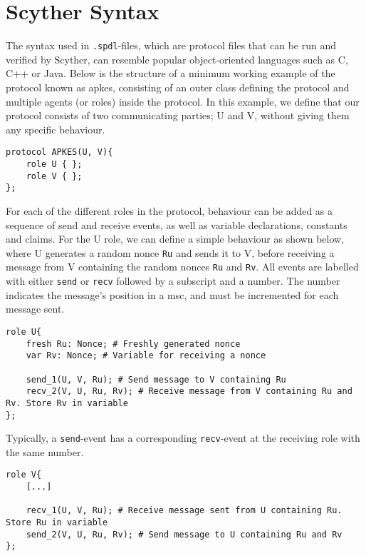\section{Scyther Syntax}


The syntax used in \verb!.spdl!-files, which are protocol files that can be run and verified by Scyther, can resemble popular object-oriented languages such as C, C++ or Java. Below is the structure of a minimum working example of the protocol known as \gls{apkes}, consisting of an outer class defining the protocol and multiple agents (or roles) inside the protocol. In this example, we define that our protocol consists of two communicating parties; U and V, without giving them any specific behaviour.\newline

\begin{lstlisting}
protocol APKES(U, V){
	role U { };
	role V { };  
};
\end{lstlisting}

For each of the different roles in the protocol, behaviour can be added as a sequence of send and receive events, as well as variable declarations, constants and claims. For the U role, we can define a simple behaviour as shown below, where U generates a random nonce \texttt{Ru} and sends it to V, before receiving a message from V containing the random nonces \texttt{Ru} and \texttt{Rv}. All events are labelled with either \texttt{send} or \texttt{recv} followed by a subscript and a number. The number indicates the message's position in a \gls{msc}, and must be incremented for each message sent.\newline

\begin{lstlisting}
role U{
	fresh Ru: Nonce; # Freshly generated nonce
	var Rv: Nonce; # Variable for receiving a nonce
	
	send_1(U, V, Ru); # Send message to V containing Ru
	recv_2(V, U, Ru, Rv); # Receive message from V containing Ru and Rv. Store Rv in variable
};
\end{lstlisting}



Typically, a \texttt{send}-event has a corresponding \texttt{recv}-event at the receiving role with the same number.\newline


\begin{lstlisting}
role V{
	[...]
	
	recv_1(U, V, Ru); # Receive message sent from U containing Ru. Store Ru in variable
	send_2(V, U, Ru, Rv); # Send message to U containing Ru and Rv
};
\end{lstlisting}


